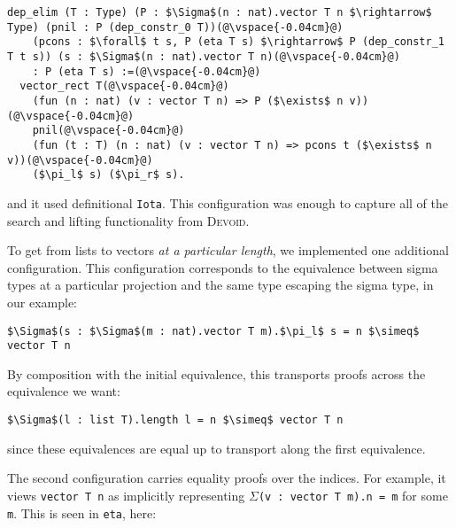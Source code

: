 \begin{lstlisting}[backgroundcolor=\color{cyan!30}]
dep_elim (T : Type) (P : $\Sigma$(n : nat).vector T n $\rightarrow$ Type) (pnil : P (dep_constr_0 T))(@\vspace{-0.04cm}@)
    (pcons : $\forall$ t s, P (eta T s) $\rightarrow$ P (dep_constr_1 T t s)) (s : $\Sigma$(n : nat).vector T n)(@\vspace{-0.04cm}@)
    : P (eta T s) :=(@\vspace{-0.04cm}@)
  vector_rect T(@\vspace{-0.04cm}@)
    (fun (n : nat) (v : vector T n) => P ($\exists$ n v))(@\vspace{-0.04cm}@)
    pnil(@\vspace{-0.04cm}@)
    (fun (t : T) (n : nat) (v : vector T n) => pcons t ($\exists$ n v))(@\vspace{-0.04cm}@)
    ($\pi_l$ s) ($\pi_r$ s).
\end{lstlisting}
and it used definitional \lstinline{Iota}.
This configuration was enough to capture all of the search and lifting functionality from \textsc{Devoid}. %

To get from lists to vectors \textit{at a particular length}, we implemented one additional configuration.
This configuration corresponds to the equivalence between sigma types at a particular projection
and the same type escaping the sigma type, in our example:

\begin{lstlisting}
$\Sigma$(s : $\Sigma$(m : nat).vector T m).$\pi_l$ s = n $\simeq$ vector T n
\end{lstlisting}
By composition with the initial equivalence, this transports proofs
across the equivalence we	 want:

\begin{lstlisting}
$\Sigma$(l : list T).length l = n $\simeq$ vector T n
\end{lstlisting}
since these equivalences are equal up to transport along the first equivalence.

The second configuration carries equality proofs over the indices.
For example, it views \lstinline{vector T n} as implicitly representing $\Sigma$\lstinline{(v : vector T m).n = m} for some \lstinline{m}.
This is seen in \lstinline{eta}, here: 

